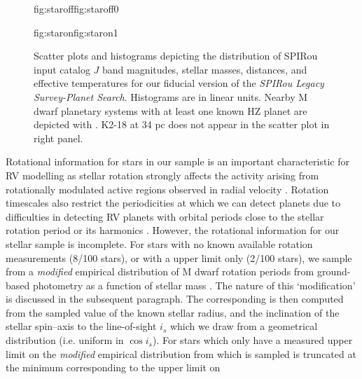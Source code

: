 \begin{figure*}
  \centering
  \hspace{-\hsize}%
  \begin{ocg}{fig:staroff}{fig:staroff}{0}%
  \end{ocg}%
  \begin{ocg}{fig:staron}{fig:staron}{1}%
  \end{ocg}
  \hspace{-\hsize}%
  \caption{Scatter plots and histograms depicting the distribution of SPIRou input catalog
    $J$ band magnitudes, stellar masses, distances, and effective temperatures for our fiducial 
    version of the \emph{SPIRou Legacy Survey-Planet Search}. Histograms are
    in linear units. Nearby M dwarf planetary systems with at least one known HZ planet
    are depicted with
    . K2-18 at 34 pc does not
    appear in the scatter plot in right panel.}
  \label{BSfig:stellardist}
\end{figure*}

Rotational information for stars in our sample is an important characteristic for RV modelling
as stellar rotation strongly affects the activity arising from rotationally modulated active
regions observed in radial velocity \citep{saar97, meunier10, aigrain12, dumusque14}.
Rotation timescales also restrict the periodicities at which we can detect planets
due to difficulties in detecting RV planets with 
orbital periods close to the stellar rotation period or its harmonics \citep{vanderburg16}. 
However, the rotational information for our stellar sample is incomplete.
For stars with no known available rotation measurements (8/100 stars),
or with a \vsini{} upper limit only (2/100 stars),
we sample \prot{} from a \emph{modified} empirical distribution of M dwarf
rotation periods from ground-based photometry as a function of stellar mass
\citep{newton16a}. The nature of this `modification' is discussed in the subsequent
paragraph. The corresponding \vsini{} is then computed
from the sampled value of \prot{,} the known stellar radius, and the
inclination of the stellar spin--axis to the line-of-sight $i_s$ which we
draw from a geometrical distribution (i.e. uniform in $\cos{i_s}$).
For stars which only have a measured upper limit on \vsini{,} 
the \emph{modified} empirical distribution from which \prot{} is sampled is
truncated at the minimum \prot{} corresponding to the upper limit on 


